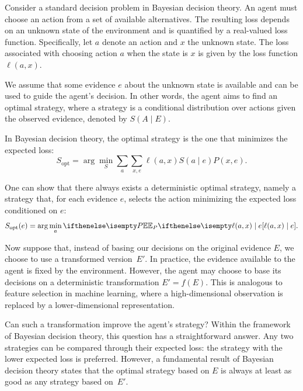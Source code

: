 
\newcommand{\util}[1][a]{\ell(#1, x)}
\newcommand{\envDist}{P}
\newcommand{\post}{\pi(x_i \mid \paramVal)}

Consider a standard decision problem in Bayesian decision theory.
An agent must choose an action from a set of available alternatives.
The resulting loss depends on an unknown state of the environment and is quantified by a real-valued loss function.
Specifically, let $a$ denote an action and $x$ the unknown state.
The loss associated with choosing action $a$ when the state is $x$ is given by the loss function $\util$.

We assume that some evidence $e$ about the unknown state is available and can be used to guide the agent's decision.
In other words, the agent aims to find an optimal strategy, where a strategy is a conditional distribution over
actions given the observed evidence, denoted by $S(A \mid E)$.

In Bayesian decision theory, the optimal strategy is the one that minimizes the expected loss:
\begin{equation*}
    S_{\text{opt}} = \arg\min_S\sum_a\sum_{x,e} \util S(a \mid e)\envDist(x, e).
\end{equation*}

One can show that there always exists a deterministic optimal strategy,
namely a strategy that, for each evidence $e$, selects the action minimizing the expected loss conditioned
on $e$:
\begin{equation*}
    S_{\text{opt}}(e) = \arg\min_a \Ex{\envDist}{\util \mid e}.
\end{equation*}

Now suppose that, instead of basing our decisions on the original evidence $E$,
we choose to use a transformed version~$E'$.
In practice, the evidence available to the agent is fixed by the environment.
However, the agent may choose to base its decisions on a deterministic transformation $E' = f(E)$.
This is analogous to feature selection in machine learning, where a high-dimensional observation is replaced by a
lower-dimensional representation.

Can such a transformation improve the agent's strategy?
Within the framework of Bayesian decision theory, this question has a straightforward answer.
Any two strategies can be compared through their expected loss: the strategy with the lower expected loss is preferred.
However, a fundamental result of Bayesian decision theory states that the optimal strategy based on $E$ is always at
least as good as any strategy based on~$E'$.

